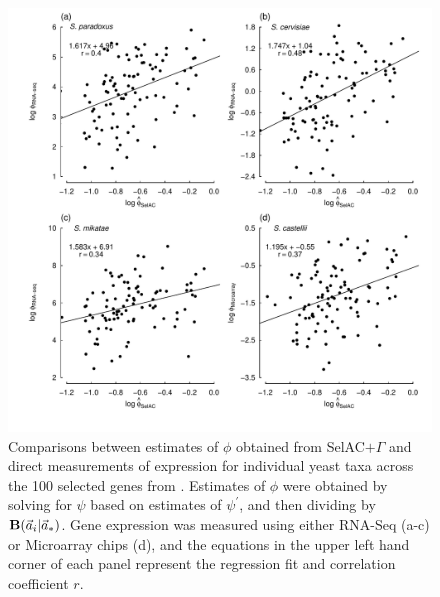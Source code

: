 \documentclass[12pt,letterpaper]{article}
\newcommand{\Funcaveci}{\ensuremath{\Func(\aveci|\aoptvec)}\xspace}
\newcommand{\Func}{\ensuremath{\text{\textbf{B}}}\xspace}
\newcommand{\selacplusgamma}{SelAC$+\Gamma$\xspace}
\newcommand{\aoptvec}{\ensuremath{\Vec{a}_*}\xspace}
\newcommand{\aveci}{\ensuremath{\Vec{a}_i}\xspace}
\newcommand{\psiprime}{\ensuremath{\psi^\prime}\xspace}
\begin{document}
\begin{figure}[H]
  \centering
  \includegraphics[width=0.9\linewidth]{FIGURE_1_SelACwG_vs_Empirical_by_spp.pdf}
  \caption{Comparisons between estimates of $\phi$ obtained from \selacplusgamma and direct measurements of expression for individual yeast taxa across the 100 selected genes from \citet{SalichosAndRokas2013}.
  	Estimates of $\phi$ were obtained by solving for $\psi$ based on estimates of $\psiprime$, and then dividing by \Funcaveci.
  	Gene expression was measured using either RNA-Seq (a-c) or Microarray chips (d), and the equations in the upper left hand corner of each panel represent the regression fit and correlation coefficient $r$.
  }
  \label{fig:PhivsEmpirical}
\end{figure}
\end{document}
